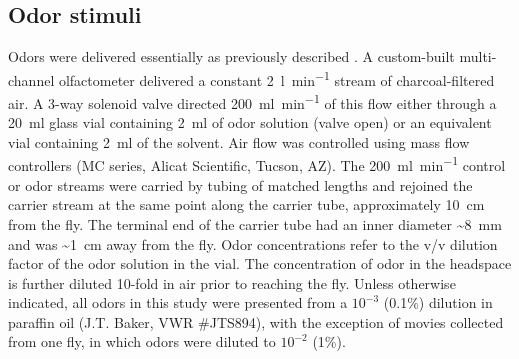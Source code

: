 \documentclass[12pt]{caltech_thesis}
\renewcommand{\cite}{{ }\autocite}
\let\Oldsubsection\subsection
\renewcommand{\subsection}{\FloatBarrier\Oldsubsection}
\begin{document}
\begin{refsection}
\subsection{Odor stimuli}
Odors were delivered essentially as previously described\cite{HongWilson2015}.
A custom-built multi-channel olfactometer delivered a constant \qty{2}{\litre\per\minute} stream of charcoal-filtered air.
A 3-way solenoid valve directed \qty{200}{\milli\litre\per\minute} of this flow either through a \qty{20}{\milli\litre} glass vial containing \qty{2}{\milli\litre} of odor solution (valve open) or an equivalent vial containing \qty{2}{\milli\litre} of the solvent.
Air flow was controlled using mass flow controllers (MC series, Alicat Scientific, Tucson, AZ).
The \qty{200}{\milli\litre\per\minute} control or odor streams were carried by tubing of matched lengths and rejoined the carrier stream at the same point along the carrier tube, approximately \qty{10}{\centi\metre} from the fly.
The terminal end of the carrier tube had an inner diameter \textasciitilde\qty{8}{\milli\metre} and was \textasciitilde\qty{1}{\centi\metre} away from the fly.
Odor concentrations refer to the v/v dilution factor of the odor solution in the vial.
The concentration of odor in the headspace is further diluted 10-fold in air prior to reaching the fly.
Unless otherwise indicated, all odors in this study were presented from a $10^{-3}$ (0.1\%) dilution in paraffin oil (J.T. Baker, VWR \#JTS894), with the exception of movies collected from one fly, in which odors were diluted to $10^{-2}$ (1\%).


\end{refsection}
\end{document}
